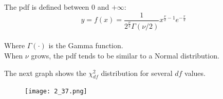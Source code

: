 \begin{frame}
  \vspace*{.5cm}
  The pdf is defined between $ 0 $ and $ +\infty $:\\
  \vspace{.5cm}
  $$y=f(x)=\dfrac{1}{2^{\frac{\nu}{2}} \Gamma(\nu/2)} x^{\frac{\nu}{2}-1} e^{-\frac{x}{2}}$$\\
  \vspace{.5cm}
  Where $\Gamma(\cdot)$ is the Gamma function.\\
  \vspace{1cm}
  When $\nu$ grows, the pdf tends to be similar to a Normal distribution.
\end{frame}

\begin{frame}
  \vspace*{.5cm}
  \centering
  The next graph shows the $ \chi^2_{df} $ distribution for several $ df $ values.\\
  \begin{figure}
    \texttt{[image: 2\_37.png]}
  \end{figure}
\end{frame}


